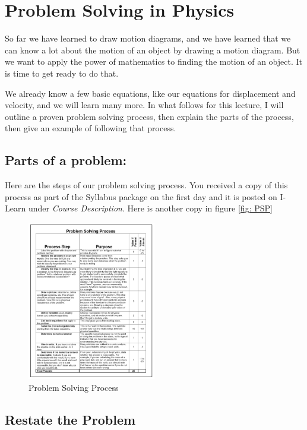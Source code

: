 \documentclass[]{Book}
\begin{document}
\chapter{Problem Solving in Physics}

So far we have learned to draw motion diagrams, and we have learned that we
can know a lot about the motion of an object by drawing a motion diagram.
But we want to apply the power of mathematics to finding the motion of an
object. It is time to get ready to do that.

We already know a few basic equations, like our equations for displacement
and velocity, and we will learn many more. In what follows for this lecture,
I will outline a proven problem solving process, then explain the parts of
the process, then give an example of following that process.

\section{Parts of a problem:}

Here are the steps of our problem solving process. You received a copy of
this process as part of the Syllabus package on the first day and it is
posted on I-Learn under \emph{Course Description}. Here is another copy in figure \ref{fig: PSP}

\begin{figure}[h!]
	\begin{center}
		\includegraphics[width=0.5\textwidth]{Problem_Solving_Process}	
		\caption{Problem Solving Process}
		\label{fig:PSP}
	\end{center}
\end{figure}


\section{Restate the Problem}
\end{document}
